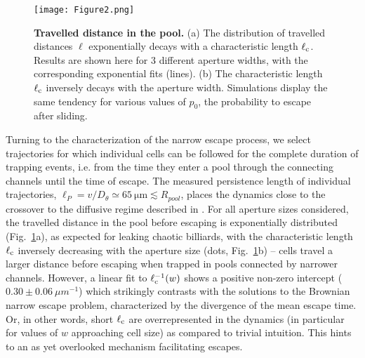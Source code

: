 \documentclass[aps,showpacs,superscriptaddress,amsfonts,twocolumn,prl]{revtex4}
\begin{document}
\begin{figure}[t]
	\texttt{[image: Figure2.png]}
	\caption{\label{fig:Travelled distance} \textbf{Travelled distance in the pool.} (a) The distribution of travelled distances $\ell$ exponentially decays with a characteristic length $\ell_{\rm c}$. Results are shown here for 3 different aperture widths, with the corresponding exponential fits (lines). (b) The characteristic length $\ell_{\rm c}$ inversely decays with the aperture width. Simulations display the same tendency for various values of $p_0$, the probability to escape after sliding.}
\end{figure}

Turning to the characterization of the narrow escape process, we select trajectories for which individual cells can be followed for the complete duration of trapping events, i.e. from the time they enter a pool through the connecting channels until the time of escape. The measured persistence length of individual trajectories, $\ell_P = v/D_{\theta} \simeq \SI{65}{\micro\meter} \lesssim R_{pool}$, places the dynamics close to the crossover to the diffusive regime described in \cite{Paoluzzi2020}. For all aperture sizes considered, the travelled distance in the pool before escaping is exponentially distributed (Fig.~\ref{fig:Travelled distance}a), as expected for leaking chaotic billiards, with the characteristic length $\ell_{\rm c}$ inversely decreasing with the aperture size (dots, Fig.~\ref{fig:Travelled distance}b) -- cells travel a larger distance before escaping when trapped in pools connected by narrower channels. However, a linear fit to $\ell_{\rm c}^{-1}(w)$ shows a positive non-zero intercept ($0.30 \pm 0.06 ~\mu m^{-1}$) which strikingly contrasts with the solutions to the Brownian narrow escape problem, characterized by the divergence of the mean escape time. Or, in other words, short $\ell_{\rm c}$ are overrepresented in the dynamics (in particular for values of $w$ approaching cell size) as compared to trivial intuition. This hints to an as yet overlooked mechanism facilitating escapes. 
\end{document}
